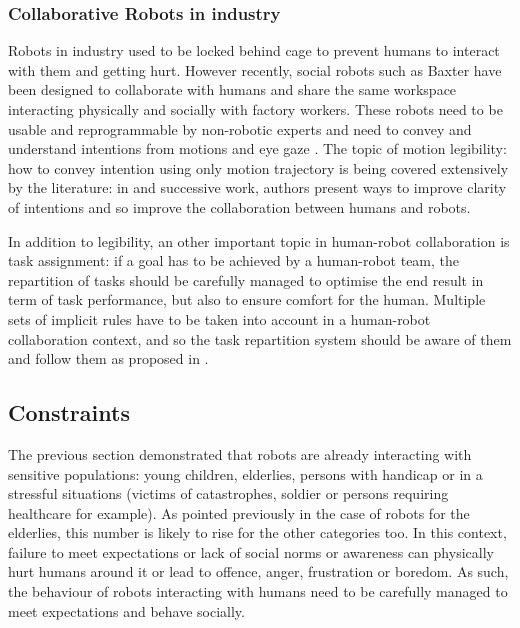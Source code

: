 \subsubsection{Collaborative Robots in industry}
	Robots in industry used to be locked behind cage to prevent humans to interact with them and getting hurt. However recently, social robots such as Baxter \citep{guizzo2012rethink} have been designed to collaborate with humans and share the same workspace interacting physically and socially with factory workers. These robots need to be usable and reprogrammable by non-robotic experts and need to convey and understand intentions from motions and eye gaze \citep{bauer2008human}. The topic of motion legibility: how to convey intention using only motion trajectory is being covered extensively by the literature: in \citet{dragan2013legibility} and successive work, authors present ways to improve clarity of intentions and so improve the collaboration between humans and robots.

    In addition to legibility, an other important topic in human-robot collaboration is task assignment: if a goal has to be achieved by a human-robot team, the repartition of tasks should be carefully managed to  optimise the end result in term of task performance, but also to ensure comfort for the human. Multiple sets of implicit rules have to be taken into account in a human-robot collaboration context, and so the task repartition system should be aware of them and follow them as proposed in \cite{montreuil2007planning}.
	

\subsection{Constraints} \label{ssec:back_constraints}

    The previous section demonstrated that robots are already interacting with sensitive populations: young children, elderlies, persons with handicap or in a stressful situations (victims of catastrophes, soldier or persons requiring healthcare for example). As pointed previously in the case of robots for the elderlies, this number is likely to rise for the other categories too. In this context, failure to meet expectations or lack of social norms or awareness can physically hurt humans around it or lead to offence, anger, frustration or boredom. As such, the behaviour of robots interacting with humans need to be carefully managed to meet expectations and behave socially.
    
